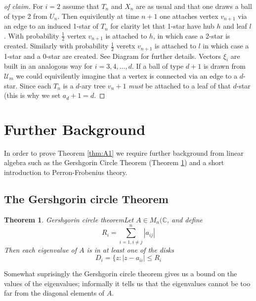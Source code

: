 \documentclass[8pt]{article} %
\newtheorem{thm}{Theorem}[section]
\theoremstyle{definition}
\begin{document}
\begin{proof}[of claim]
 For $i = 2$ assume that $T_n$ and $X_n$ are as usual and that one draws a ball of type 2 from $U_n$.  Then equivilently at time $n+1$ one attaches vertex $v_{n+1}$ via an edge to an induced 1-star of $T_n$ for clarity let that 1-star have hub $h$ and leaf $l$.  With probability $\frac{1}{2}$ vertex $v_{n+1}$ is attached to $h$, in which case a 2-star is created.  Similarly with probability $\frac{1}{2}$ veretx $v_{n+1}$ is attached to $l$ in which case a 1-star and a 0-star are created.  See Diagram %
 for further details.  Vectors $\xi_i$ are built in an analogous way for $i = 3,4,\dots,d$.  If a ball of type $d+1$ is drawn from $\mathcal{U}_m$ we could equivilently imagine that a vertex is connected via an edge to a $d$-star.  Since each $T_n$ is a $d$-ary tree $v_n+1$ \emph{must} be attached to a leaf of that $d$-star (this is why we set $a_d+1 = d$.  
 \end{proof} 




\section{Further Background}

In order to prove Theorem \ref{thm:A1} we require further background from linear algebra such as the Gershgorin Circle Theorem (Theorem \ref{thm:gct}) and a short introduction to Perron-Frobenius theory.

\subsection{The Gershgorin circle Theorem}

\begin{thm}{Gershgorin circle theorem}\label{thm:gct}
 Let $A \in M_n(\mathbb{C}$, and define 
 \[R_i = \sum_{i = 1, i \neq j}^n |a_{ij}|\]
 Then each eigenvalue of $A$ is in at least one of the disks 
\[D_{i} = \{z : | z-a_{ii}| \leq R_{i}\]
\end{thm}
Somewhat suprisingly the Gershgorin circle theorem gives us a bound on the values of the eigenvalues; informally it tells us that the eigenvalues cannot be too far from the diagonal elements of $A$. 
\end{document}
